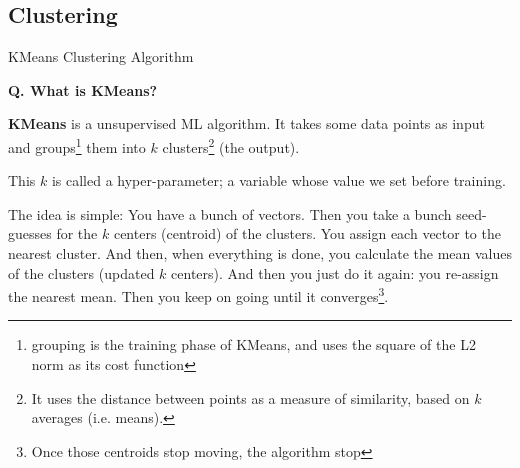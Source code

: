 
\subsection{Clustering}
\begin{transitionsubframe}
  \begin{center}
    \Huge KMeans Clustering Algorithm
  \end{center}
\end{transitionsubframe}


\begin{frame}[fragile]{\textbf{Q. What is KMeans?}}
  \begin{wideitemize}
  \item \textbf{KMeans} is a unsupervised ML algorithm. It takes some data points
  as input and groups\footnote{grouping is the training phase of KMeans, and uses
  the square of the L2 norm as its cost function} them into $k$
  clusters\footnote{It uses the distance between points as a measure of similarity,
  based on $k$ averages (i.e. means).} (the output).\medskip
  \begin{wideitemize}
    \item This $k$ is called a hyper-parameter; a variable whose value we set before training.
    \item The idea is simple: You have a bunch of vectors. Then you take a bunch seed-guesses for the
    $k$ centers (centroid) of the clusters. You assign each vector to the nearest cluster. And then,
    when everything is done, you calculate the mean values of the clusters (updated $k$ centers).
    And then you just do it again: you re-assign the nearest mean. Then you keep on going
    until it converges\footnote{Once those centroids stop moving, the algorithm stop}.
  \end{wideitemize}
  \end{wideitemize}
\end{frame}

